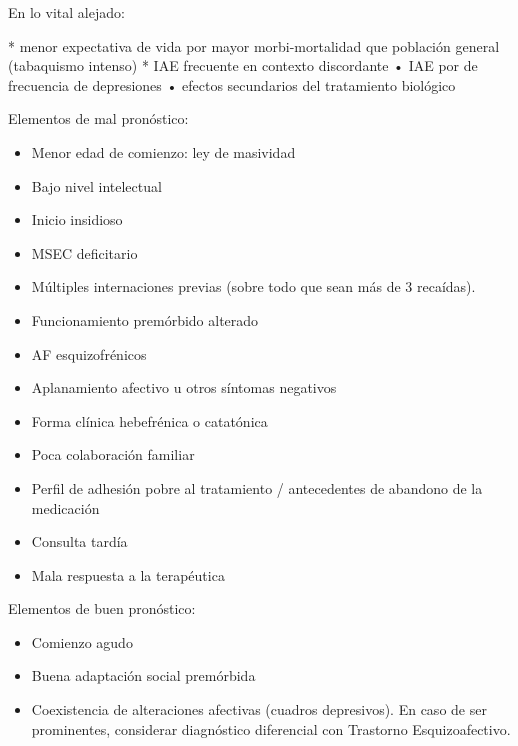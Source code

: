 En lo vital alejado:

* menor expectativa de vida por mayor morbi-mortalidad que población general (tabaquismo intenso)
* IAE frecuente en contexto discordante • IAE por de frecuencia de depresiones • efectos secundarios del tratamiento biológico

Elementos de mal pronóstico:
\begin{itemize}
    \item Menor edad de comienzo: ley de masividad
    \item Bajo nivel intelectual
    \item Inicio insidioso
    \item MSEC deficitario
    \item Múltiples internaciones previas (sobre todo que sean más de 3 recaídas).
    \item Funcionamiento premórbido alterado
    \item AF esquizofrénicos
    \item Aplanamiento afectivo u otros síntomas negativos
    \item Forma clínica hebefrénica o catatónica
    \item Poca colaboración familiar
    \item Perfil de adhesión pobre al tratamiento / antecedentes de abandono de la medicación
    \item Consulta tardía
    \item Mala respuesta a la terapéutica
\end{itemize}
Elementos de buen pronóstico:
\begin{itemize}
    \item Comienzo agudo
    \item Buena adaptación social premórbida
    \item Coexistencia de alteraciones afectivas (cuadros depresivos). En caso de ser prominentes, considerar diagnóstico diferencial con Trastorno Esquizoafectivo.
\end{itemize}
\printbibliography
